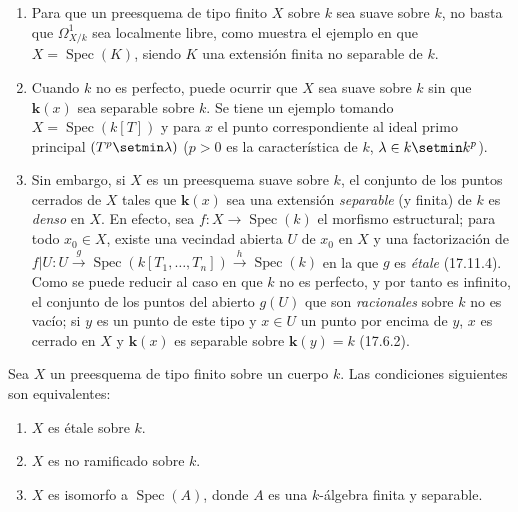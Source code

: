 \begin{remarks}[17.15.10]
\label{IV.17.15.10}
\begin{enumerate}
  \item[(i)] Para que un preesquema de tipo finito $X$ sobre $k$ sea suave sobre $k$, no basta que $\varOmega^1_{X/k}$ sea localmente libre, como muestra el ejemplo en que $X=\operatorname{Spec}(K)$, siendo $K$ una extensión finita no separable de $k$.
  \item[(ii)] Cuando $k$ no es perfecto, puede ocurrir que $X$ sea suave sobre $k$ sin que $\boldsymbol{k}(x)$ sea separable sobre $k$. Se tiene un ejemplo tomando $X=\operatorname{Spec}(k[T])$ y para $x$ el punto correspondiente al ideal primo principal $(T^p\setmin\lambda)$ ($p>0$ es la característica de $k$, $\lambda\in k\setmin k^p$).
  \item[(iii)] Sin embargo, si $X$ es un preesquema suave sobre $k$, el conjunto de los puntos cerrados de $X$ tales que $\boldsymbol{k}(x)$ sea una extensión \emph{separable} (y finita) de $k$ es \emph{denso} en $X$. En efecto, sea $f:X\to\operatorname{Spec}(k)$ el morfismo estructural; para todo $x_0\in X$, existe una vecindad abierta $U$ de $x_0$ en $X$ y una factorización de $f|U:U\xrightarrow{g}\operatorname{Spec}(k[T_1,\ldots,T_n])\xrightarrow{h}\operatorname{Spec}(k)$ en la que $g$ es \emph{étale} (17.11.4). Como se puede reducir al caso en que $k$ no es perfecto, y por tanto es infinito, el conjunto de los puntos del abierto $g(U)$ que son \emph{racionales} sobre $k$ no es vacío; si $y$ es un punto de este tipo y $x\in U$ un punto por encima de $y$, $x$ es cerrado en $X$ y $\boldsymbol{k}(x)$ es separable sobre $\boldsymbol{k}(y)=k$ (17.6.2).
\end{enumerate}
\end{remarks}

\begin{proposition}[17.15.11]
\label{IV.17.15.11}
Sea $X$ un preesquema de tipo finito sobre un cuerpo $k$. Las condiciones siguientes son equivalentes:
\begin{enumerate}
  \item[\textup{a)}] $X$ es étale sobre $k$.
  \item[\textup{b)}] $X$ es no ramificado sobre $k$.
  \item[\textup{c)}] $X$ es isomorfo a $\operatorname{Spec}(A)$, donde $A$ es una $k$-álgebra finita y separable.
\end{enumerate}
\end{proposition}

